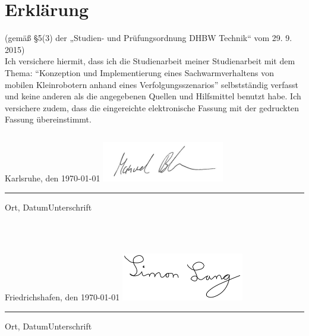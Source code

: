 \pagestyle{scrheadings}
\clearscrheadfoot
{}

\section*{Erklärung}

(gemäß §5(3) der „Studien- und Prüfungsordnung DHBW Technik“ vom 29. 9. 2015)\\
Ich versichere hiermit, dass ich die Studienarbeit meiner Studienarbeit mit dem Thema: \enquote{Konzeption und Implementierung eines Sachwarmverhaltens von mobilen Kleinrobotern anhand eines Verfolgungsszenarios} selbstständig verfasst und keine anderen als die angegebenen Quellen und Hilfsmittel benutzt habe. Ich versichere zudem, dass die eingereichte elektronische Fassung mit der gedruckten Fassung übereinstimmt.\\
\begin{verbatim}
\end{verbatim}
Karlsruhe, den \today 
\hspace{4cm}
\includegraphics[width=0.4\textwidth]{images/sign.png} \\
\noindent\rule{\textwidth}{1pt}
\noindent Ort, Datum\hfill\hfill Unterschrift
\begin{verbatim}



\end{verbatim}
Friedrichshafen, den \today 
\hspace{3cm}
\includegraphics[width=0.4\textwidth]{images/Unterschrift.png} \\
\noindent\rule{\textwidth}{1pt}
\noindent Ort, Datum\hfill\hfill Unterschrift